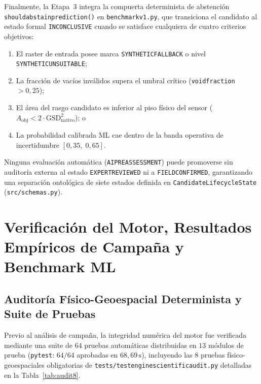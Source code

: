 \documentclass[11pt,a4paper]{article}
\DeclareRobustCommand{\_}{\ifmmode\mbox{\textunderscore}\else\textunderscore\allowbreak\fi}
\begin{document}
Finalmente, la Etapa~3 integra la compuerta determinista de abstenci\'on \texttt{should\_abstain\_prediction()} en \texttt{benchmark\_v1.py}, que transiciona el candidato al estado formal \texttt{INCONCLUSIVE} cuando se satisface cualquiera de cuatro criterios objetivos:
\begin{enumerate}
  \item El raster de entrada posee marca \texttt{SYNTHETIC\_FALLBACK} o nivel \texttt{SYNTHETIC\_UNSUITABLE};
  \item La fracci\'on de vac\'ios inv\'alidos supera el umbral cr\'itico (\texttt{void\_fraction} $> 0{,}25$);
  \item El \'area del rasgo candidato es inferior al piso f\'isico del sensor ($A_{\mathrm{obj}} < 2 \cdot \mathrm{GSD}_{\mathrm{nativo}}^2$); o
  \item La probabilidad calibrada ML cae dentro de la banda operativa de incertidumbre $[0{,}35,\; 0{,}65]$.
\end{enumerate}
Ninguna evaluaci\'on autom\'atica (\texttt{AI\_PREASSESSMENT}) puede promoverse sin auditor\'ia externa al estado \texttt{EXPERT\_REVIEWED} ni a \texttt{FIELD\_CONFIRMED}, garantizando una separaci\'on ontol\'ogica de siete estados definida en \texttt{CandidateLifecycleState} (\texttt{src/schemas.py}).

\FloatBarrier
\section{Verificaci\'on del Motor, Resultados Emp\'iricos de Campa\~na y Benchmark ML}

\subsection{Auditor\'ia F\'isico-Geoespacial Determinista y Suite de Pruebas}

Previo al an\'alisis de campa\~na, la integridad num\'erica del motor fue verificada mediante una suite de $64$ pruebas autom\'aticas distribuidas en $13$ m\'odulos de prueba (\texttt{pytest}: $64/64$ aprobadas en $68{,}69\,\mathrm{s}$), incluyendo las $8$ pruebas f\'isico-geoespaciales obligatorias de \texttt{tests/test\_engine\_scientific\_audit.py} detalladas en la Tabla~\ref{tab:audit8}.
\end{document}
